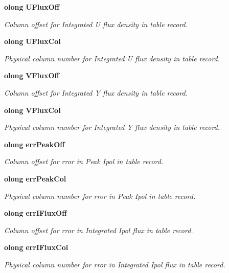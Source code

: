 \begin{CompactItemize}
{\bf olong} {\bf UFlux\-Off}
\begin{CompactList}\small\item\em Column offset for Integrated U flux density in table record. \item\end{CompactList}\item 
{\bf olong} {\bf UFlux\-Col}
\begin{CompactList}\small\item\em Physical column number for Integrated U flux density in table record. \item\end{CompactList}\item 
{\bf olong} {\bf VFlux\-Off}
\begin{CompactList}\small\item\em Column offset for Integrated Y flux density in table record. \item\end{CompactList}\item 
{\bf olong} {\bf VFlux\-Col}
\begin{CompactList}\small\item\em Physical column number for Integrated Y flux density in table record. \item\end{CompactList}\item 
{\bf olong} {\bf err\-Peak\-Off}
\begin{CompactList}\small\item\em Column offset for rror in Peak Ipol in table record. \item\end{CompactList}\item 
{\bf olong} {\bf err\-Peak\-Col}
\begin{CompactList}\small\item\em Physical column number for rror in Peak Ipol in table record. \item\end{CompactList}\item 
{\bf olong} {\bf err\-IFlux\-Off}
\begin{CompactList}\small\item\em Column offset for rror in Integrated Ipol flux in table record. \item\end{CompactList}\item 
{\bf olong} {\bf err\-IFlux\-Col}
\begin{CompactList}\small\item\em Physical column number for rror in Integrated Ipol flux in table record. \item\end{CompactList}\item 

\end{CompactItemize}
